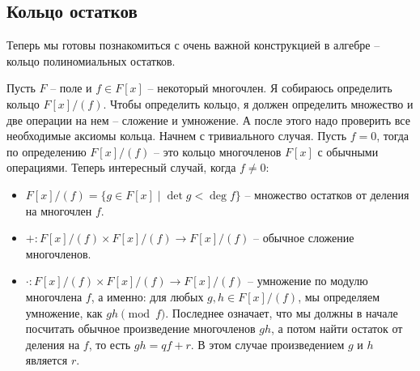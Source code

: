 \subsection{Кольцо остатков}

Теперь мы готовы познакомиться с очень важной конструкцией в алгебре -- кольцо полиномиальных остатков.

Пусть $F$ -- поле и $f\in F[x]$ -- некоторый многочлен.
Я собираюсь определить кольцо $F[x]/(f)$.
Чтобы определить кольцо, я должен определить множество и две операции на нем -- сложение и умножение.
А после этого надо проверить все необходимые аксиомы кольца.
Начнем с тривиального случая.
Пусть $f = 0$, тогда по определению $F[x]/(f)$ -- это кольцо многочленов $F[x]$ с обычными операциями.
Теперь интересный случай, когда $f \neq 0$:
\begin{itemize}
\item $F[x]/(f) = \{g \in F[x]\mid \det g < \deg f\}$ -- множество остатков от деления на многочлен $f$.

\item $+\colon F[x]/(f)\times F[x]/(f) \to F[x]/(f)$ -- обычное сложение многочленов.

\item $\cdot \colon F[x]/(f)\times F[x]/(f) \to F[x]/(f)$ -- умножение по модулю многочлена $f$, а именно: для любых $g, h\in F[x]/(f)$, мы определяем умножение, как  $gh \pmod{f}$.
Последнее означает, что мы должны в начале посчитать обычное произведение многочленов $gh$, а потом найти остаток от деления на $f$, то есть $gh = q f + r$.
В этом случае произведением $g$ и  $h$ является $r$.
\end{itemize}

